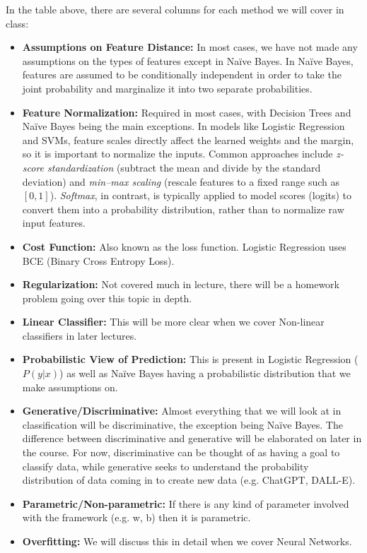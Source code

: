 \documentclass{article}
\begin{document}
In the table above, there are several columns for each method we will cover in class:
\begin{itemize}
\item \textbf{Assumptions on Feature Distance:} In most cases, we have not made any assumptions on the types of features except in Na\"{i}ve Bayes. In Na\"{i}ve Bayes, features are assumed to be conditionally independent in order to take the joint probability and marginalize it into two separate probabilities.
\item \textbf{Feature Normalization:} Required in most cases, with Decision Trees and Na\"{i}ve Bayes being the main exceptions. In models like Logistic Regression and SVMs, feature scales directly affect the learned weights and the margin, so it is important to normalize the inputs. Common approaches include \textit{z-score standardization} (subtract the mean and divide by the standard deviation) and \textit{min--max scaling} (rescale features to a fixed range such as $[0,1]$). \textit{Softmax}, in contrast, is typically applied to model scores (logits) to convert them into a probability distribution, rather than to normalize raw input features.
\item \textbf{Cost Function:} Also known as the loss function. Logistic Regression uses BCE (Binary Cross Entropy Loss).
\item \textbf{Regularization:} Not covered much in lecture, there will be a homework problem going over this topic in depth.
\item \textbf{Linear Classifier:} This will be more clear when we cover Non-linear classifiers in later lectures.
\item \textbf{Probabilistic View of Prediction:} This is present in Logistic Regression ($P(y|x)$) as well as Na\"{i}ve Bayes having a probabilistic distribution that we make assumptions on.
\item \textbf{Generative/Discriminative:} Almost everything that we will look at in classification will be discriminative, the exception being Na\"{i}ve Bayes. The difference between discriminative and generative will be elaborated on later in the course. For now, discriminative can be thought of as having a goal to classify data, while generative seeks to understand the probability distribution of data coming in to create new data (e.g. ChatGPT, DALL-E).
\item \textbf{Parametric/Non-parametric:} If there is any kind of parameter involved with the framework (e.g. w, b) then it is parametric.
\item \textbf{Overfitting:} We will discuss this in detail when we cover Neural Networks.
\end{itemize}
\end{document}
